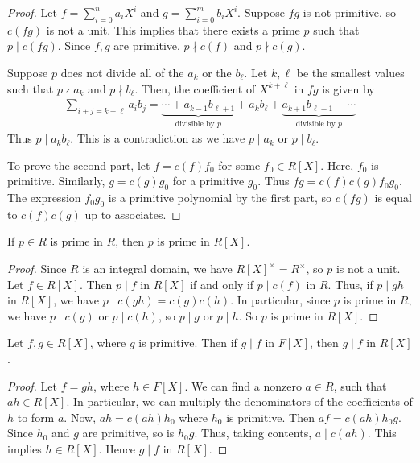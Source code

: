 \begin{proof}
	Let $f = \sum_{i=0}^n a_i X^i$ and $g = \sum_{i=0}^m b_i X^i$.
	Suppose $fg$ is not primitive, so $c(fg)$ is not a unit.
	This implies that there exists a prime $p$ such that $p \mid c(fg)$.
	Since $f, g$ are primitive, $p \nmid c(f)$ and $p \nmid c(g)$.

	Suppose $p$ does not divide all of the $a_k$ or the $b_\ell$.
	Let $k, \ell$ be the smallest values such that $p \nmid a_k$ and $p \nmid b_\ell$.
	Then, the coefficient of $X^{k+\ell}$ in $fg$ is given by
	\begin{align*}
		\sum_{i+j=k+\ell} a_i b_j = \underbrace{\cdots + a_{k-1} b_{\ell+1}}_{\text{divisible by } p} + a_k b_\ell + \underbrace{a_{k+1} b_{\ell - 1} + \cdots}_{\text{divisible by } p}
	\end{align*}
	Thus $p \mid a_k b_\ell$.
	This is a contradiction as we have $p \mid a_k$ or $p \mid b_\ell$.

	To prove the second part, let $f = c(f) f_0$ for some $f_0 \in R[X]$.
	Here, $f_0$ is primitive.
	Similarly, $g = c(g) g_0$ for a primitive $g_0$.
	Thus $fg = c(f) c(g) f_0 g_0$.
	The expression $f_0 g_0$ is a primitive polynomial by the first part, so $c(fg)$ is equal to $c(f) c(g)$ up to associates.
\end{proof}
\begin{corollary}
	If $p \in R$ is prime in $R$, then $p$ is prime in $R[X]$.
\end{corollary}
\begin{proof}
	Since $R$ is an integral domain, we have $R[X]^\times = R^\times$, so $p$ is not a unit.
	Let $f \in R[X]$.
	Then $p \mid f$ in $R[X]$ if and only if $p \mid c(f)$ in $R$.
	Thus, if $p \mid gh$ in $R[X]$, we have $p \mid c(gh) = c(g) c(h)$.
	In particular, since $p$ is prime in $R$, we have $p \mid c(g)$ or $p \mid c(h)$, so $p \mid g$ or $p \mid h$.
	So $p$ is prime in $R[X]$.
\end{proof}
\begin{lemma}
	Let $f,g \in R[X]$, where $g$ is primitive.
	Then if $g \mid f$ in $F[X]$, then $g \mid f$ in $R[X]$.
\end{lemma}
\begin{proof}
	Let $f = gh$, where $h \in F[X]$.
	We can find a nonzero $a \in R$, such that $ah \in R[X]$.
	In particular, we can multiply the denominators of the coefficients of $h$ to form $a$.
	Now, $ah = c(ah) h_0$ where $h_0$ is primitive.
	Then $af = c(ah) h_0 g$.
	Since $h_0$ and $g$ are primitive, so is $h_0 g$.
	Thus, taking contents, $a \mid c(ah)$.
	This implies $h \in R[X]$.
	Hence $g \mid f$ in $R[X]$.
\end{proof}
